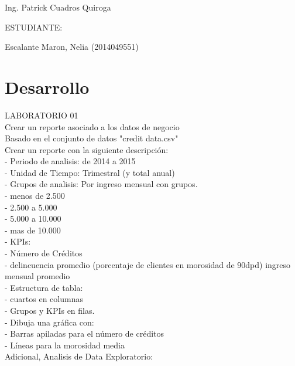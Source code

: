 \documentclass[12pt,letterpaper]{article}
\begin{document}
\begin{titlepage}
\begin{center}
\vspace*{0.1in}
\begin{large}
 Ing. Patrick Cuadros Quiroga\\
\end{large}

\vspace*{0.2in}
\vspace*{0.1in}
\begin{large}
ESTUDIANTE: \\
\begin{flushleft}
Escalante Maron, Nelia 		\hfill	(2014049551) \\

\end{flushleft}
\end{large}
\end{center}

\end{titlepage}


 \tableofcontents
 \newpage

 
\section{Desarrollo} 
LABORATORIO 01\\

Crear un reporte asociado a los datos de negocio\\
Basado en el conjunto de datos "credit data.csv"\\

Crear un reporte con la siguiente descripci\'on:\\

- Periodo de analisis: de 2014 a 2015\\
- Unidad de Tiempo: Trimestral (y total anual)\\
- Grupos de analisis: Por ingreso mensual con grupos.\\
	- menos de 2.500\\
	- 2.500 a 5.000\\
	- 5.000 a 10.000\\
	- mas de 10.000\\
- KPIs:\\
	- N\'umero de Cr\'editos\\
	- delincuencia promedio (porcentaje de clientes en morosidad de 90dpd) ingreso mensual promedio\\
- Estructura de tabla:\\
	- cuartos en columnas\\
	- Grupos y KPIs en filas.\\
- Dibuja una gr\'afica con:\\
	- Barras apiladas para el n\'umero de cr\'editos\\
	- L\'ineas para la morosidad media\\
Adicional, Analisis de Data Exploratorio:\\
\end{document}
